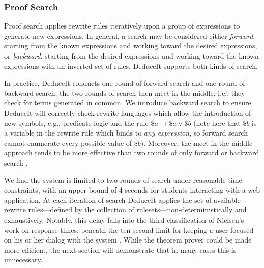\documentclass{sigchi}
\begin{document}
\subsubsection{Proof Search}

Proof search applies rewrite rules iteratively upon a group of expressions to generate new expressions. In general, a search may be considered either \textit{forward}, starting from the known expressions and working toward the desired expressions, or \textit{backward}, starting from the desired expressions and working toward the known expressions with an inverted set of rules. DeduceIt supports both kinds of search. 


In practice, DeduceIt conducts one round of forward search and one round of backward search; the two rounds of search then meet in the middle, i.e., they check for terms generated in common. We introduce backward search to ensure DeduceIt will correctly check rewrite languages which allow the introduction of new symbols, e.g., predicate logic and the rule $\$a \rightarrow \$a \vee \$b$ (note here that $\$b$ is a variable in the rewrite rule which binds to \textit{any expression}, so forward search cannot enumerate every possible value of $\$b$). Moreover, the meet-in-the-middle approach tends to be more effective than two rounds of only forward or backward search \cite{bisearch}.

We find the system is limited to two rounds of search under reasonable time constraints, with an upper bound of 4 seconds for students interacting with a web application. At each iteration of search DeduceIt applies the set of available rewrite rules---defined by the collection of rulesets---non-deterministically and exhaustively. Notably, this delay falls into the third classification of Nielsen's work on response times, beneath the ten-second limit for keeping a user focused on his or her dialog with the system \cite{neilsen}. While the theorem prover could be made more efficient, the next section will demonstrate that in many cases this is unnecessary.
\end{document}
